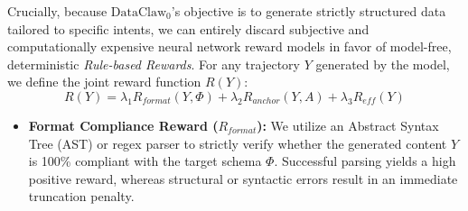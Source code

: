 Crucially, because $\text{DataClaw}_0$'s objective is to generate strictly structured data tailored to specific intents, we can entirely discard subjective and computationally expensive neural network reward models in favor of model-free, deterministic \textit{Rule-based Rewards}. For any trajectory \(Y\) generated by the model, we define the joint reward function \(R(Y)\):
\begin{equation}
R(Y) = \lambda_1 R_{format}(Y, \Phi) + \lambda_2 R_{anchor}(Y, A) + \lambda_3 R_{eff}(Y)
\end{equation}

\begin{itemize}[leftmargin=20pt, labelsep=4pt]
    \item \textbf{Format Compliance Reward (\(R_{format}\)):} We utilize an Abstract Syntax Tree (AST) or regex parser to strictly verify whether the generated content \(Y\) is 100\% compliant with the target schema \(\Phi\). Successful parsing yields a high positive reward, whereas structural or syntactic errors result in an immediate truncation penalty.
    


\end{itemize}
